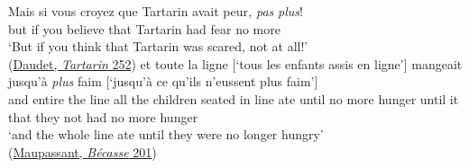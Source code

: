 \ea \label{ex:03-06}
\ea
\gll Mais si vous croyez que Tartarin avait peur\textit{,} \textit{pas} \textit{plus}!\\
 but if you believe that Tartarin had fear no more\\
\glt `But if you think that Tartarin was scared, not at all!'\\
\hfill(\href{https://archive.org/details/tartarinsurlesa01daudgoog/page/n147/mode/2up?q=%22Mais+si+vous+croyez+que+Tartarin%22&view=theater}{Daudet, \textit{Tartarin} 252})
\ex
\gll et toute la ligne [`tous les enfants assis en ligne'] mangeait jusqu'à \textit{plus} faim [`jusqu'à ce qu'ils n'eussent plus faim']\\
 and entire the line all the children seated in line ate until {no more} hunger until it {that they} {not had} {no more} hunger\\
\glt `and the whole line ate until they were no longer hungry'\\
\hfill(\href{https://archive.org/details/contesdelabcas00maupuoft/page/170/mode/2up?q=%22mangeait+jusqu%E2%80%99%C3%A0+plus+faim%22&view=theater}{Maupassant, \textit{Bécasse} 201}) %
\z
\z{}

